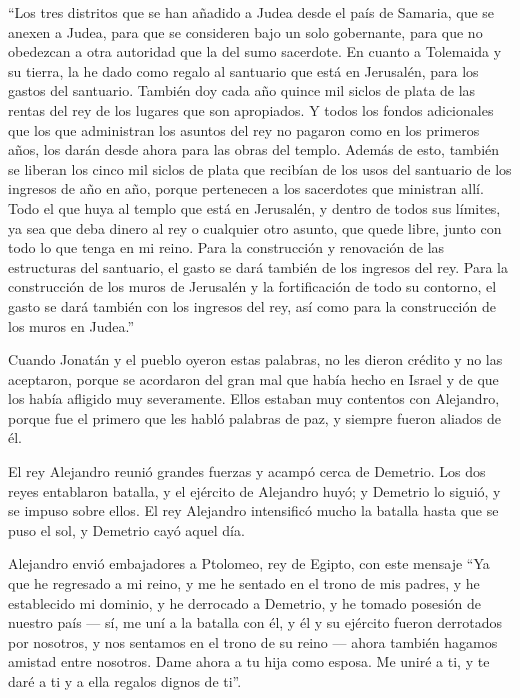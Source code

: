  ``Los tres distritos que se han añadido a Judea desde el
país de Samaria, que se anexen a Judea, para que se consideren bajo un
solo gobernante, para que no obedezcan a otra autoridad que la del sumo
sacerdote.  En cuanto a Tolemaida y su tierra, la he dado
como regalo al santuario que está en Jerusalén, para los gastos del
santuario.  También doy cada año quince mil siclos de
plata de las rentas del rey de los lugares que son apropiados.
 Y todos los fondos adicionales que los que administran
los asuntos del rey no pagaron como en los primeros años, los darán
desde ahora para las obras del templo.  Además de esto,
también se liberan los cinco mil siclos de plata que recibían de los
usos del santuario de los ingresos de año en año, porque pertenecen a
los sacerdotes que ministran allí.  Todo el que huya al
templo que está en Jerusalén, y dentro de todos sus límites, ya sea que
deba dinero al rey o cualquier otro asunto, que quede libre, junto con
todo lo que tenga en mi reino.  Para la construcción y
renovación de las estructuras del santuario, el gasto se dará también de
los ingresos del rey.  Para la construcción de los muros
de Jerusalén y la fortificación de todo su contorno, el gasto se dará
también con los ingresos del rey, así como para la construcción de los
muros en Judea.''

 Cuando Jonatán y el pueblo oyeron estas palabras, no les
dieron crédito y no las aceptaron, porque se acordaron del gran mal que
había hecho en Israel y de que los había afligido muy severamente.
 Ellos estaban muy contentos con Alejandro, porque fue el
primero que les habló palabras de paz, y siempre fueron aliados de él.

 El rey Alejandro reunió grandes fuerzas y acampó cerca
de Demetrio.  Los dos reyes entablaron batalla, y el
ejército de Alejandro huyó; y Demetrio lo siguió, y se impuso sobre
ellos.  El rey Alejandro intensificó mucho la batalla
hasta que se puso el sol, y Demetrio cayó aquel día.

 Alejandro envió embajadores a Ptolomeo, rey de Egipto,
con este mensaje  ``Ya que he regresado a mi reino, y me
he sentado en el trono de mis padres, y he establecido mi dominio, y he
derrocado a Demetrio, y he tomado posesión de nuestro país ---
 sí, me uní a la batalla con él, y él y su ejército
fueron derrotados por nosotros, y nos sentamos en el trono de su reino
---  ahora también hagamos amistad entre nosotros. Dame
ahora a tu hija como esposa. Me uniré a ti, y te daré a ti y a ella
regalos dignos de ti''.

